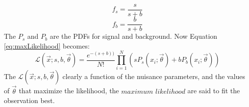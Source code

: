 \begin{equation}
f_{s}=\frac{s}{s+b}
\end{equation}        
\begin{equation}
f_{b}=\frac{b}{s+b}
\end{equation}        
The $P_{s}$ and $P_{b}$ are the PDFs for signal and background. 
Now Equation \ref{eq:maxLikelihood} becomes:
\begin{equation}
\mathcal{L}(\vec{x}; s, b, \vec{\theta})=\frac{e^{-(s+b))}}{N!}\prod_{i=1}^{N}\left( sP_{s}(x_{i}; \vec{\theta})+bP_{b}(x_{i};\vec{\theta})\right)
\end{equation}
The $\mathcal{L}(\vec{x}; s, b, \vec{\theta})$ clearly a function of the nuisance parameters, and the values of $\vec{\theta}$ that maximize the likelihood, the $maximum$ $likelihood$ are said to fit the observation best.
